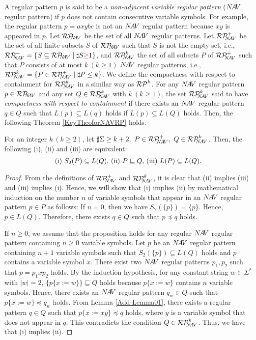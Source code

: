 

A regular pattern $p$ is said to be a {\it non-adjacent variable regular pattern} ($N\!A\!V$ regular pattern)  
if $p$ does not contain consecutive variable symbols.
For example, the regular pattern $p=axybc$ is not an $N\!A\!V$ regular pattern because $xy$ is appeared in $p$.
Let $\mathcal{RP}_{\!\!\!N\!\!A\!V}$ be the set of all $N\!A\!V$ regular patterns.
Let $\mathcal{RP}^{+}_{\!\!\!N\!A\!V}$ be the set of all finite subsets $S$ of $\mathcal{RP}_{\!\!\!N\!\!A\!V}$ such that $S$ is not the empty set, i.e., $\NAVRPplus=\{S \subseteq \NAVRP \mid \sharp S {\color{red} \geq} 1\}$,
and $\mathcal{RP}^{k}_{\!\!\!N\!A\!V}$ the set of all subsets $P$ of $\mathcal{RP}^{+}_{\!\!\!N\!A\!V}$ such that $P$ consists of at most $k~(k\geq 1)$ $N\!A\!V$ regular patterns, i.e., $\NAVRPkei=\{P\in \NAVRPplus \mid \sharp P \leq k\}$.
We define the compactness with respect to containment for $\mathcal{RP}^{k}_{\!\!\!N\!A\!V}$ in a similar way as {\color{red}$\mathcal{RP}^{k}$}.%
 For any $N\!A\!V$ regular pattern $p \in \mathcal{RP}_{\!\!\!N\!\!A\!V}$ and any set $Q \in \mathcal{RP}^{k}_{\!\!\!N\!A\!V}$ with $k~(k\geq 1)$,
  the set $\mathcal{RP}^{k}_{\!\!\!N\!A\!V}$ said to have {\it compactness with respect to containment}
  if there exists an $N\!A\!V$ regular pattern $q \in Q$ such that $L(p) \subseteq L(q)$ holds if $L(p) \subseteq L(Q)$ holds.
Then, the following Theorem \ref{KeyTheoforNAVRP} holds.

\begin{thm}\label{KeyTheoforNAVRP}
For an integer $k~(k\ge 2)$, let $\sharp \Sigma \ge k+2,~P\in \NAVRPplus,~Q \in \NAVRPkei$.  
Then, the following (i), (ii) and (iii) are equivalent:
\[
\begin{tabular}{ll}
(i) $S_{2}(P) \subseteq L(Q)$,
(ii) $P \sqsubseteq Q$,
(iii) $L(P) \subseteq L(Q)$.
\end{tabular}
\]
\end{thm}

\begin{proof}
From the definitions of $\mathcal{RP}^{+}_{\!\!\!N\!A\!V}$ and $\mathcal{RP}^{k}_{\!\!\!N\!A\!V}$, it is clear that (ii) implies (iii)  and  (iii) implies (i).
Hence, we will show that (i) implies (ii) 
by mathematical induction on the number $n$ of variable symbols that appear in an $N\!A\!V$ regular pattern $p\in P$ as follows:
If $n=0$, then we have $S_{2}(\{p\})= \{ p \}$.
Hence, $p \in L(Q)$.
Therefore, there exists $q \in Q$ such that $p \preceq q$ holds.

If $n \ge 0$, we assume that the proposition holds for any regular $N\!A\!V$ regular pattern containing $n \ge 0$ variable symbols.
Let $p$ be an $N\!A\!V$ regular pattern containing $n+1$ variable symbols such that $S_{2}(\{p\}) \subseteq L(Q)$ holds and $p$ contains a variable symbol $x$.
There exist two $N\!A\!V$ regular patterns $p_{1},p_{2}$ such that $p=p_{1}xp_{2}$ holds.
By the induction hypothesis, for any constant string $w\in \Sigma^{\ast}$ with $|w|=2$, {\color{red}$\{p\{x:=w\}\}\sqsubseteq Q$} holds because $p\{x:=w\}$ contains $n$ variable symbols.
Hence, there exists an $N\!A\!V$ regular pattern $q_{w} \in Q$ such that $p \{ x:=w \} \preceq q_{w}$ holds.
From Lemma \ref{Add-Lemma01}, 
there exists a regular pattern $q \in Q$ such that $p \{ x:=xy \} \preceq q$ holds, where $y$ is a variable symbol that does not appear in $q$.
This contradicts the condition $Q \in \mathcal{RP}^{k}_{\!\!\!N\!A\!V}$.
Thus, we have that (i) implies (ii).
\end{proof}

